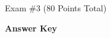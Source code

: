 \documentclass{article}
\begin{document}
\begin{EXAM}






\end{EXAM}

\begin{center}
\Large Exam \#3 (80 Points Total) \begin{KEY}\textbf{Answer Key}\end{KEY}
\end{center}
\normalsize
\bigskip
\end{document}
